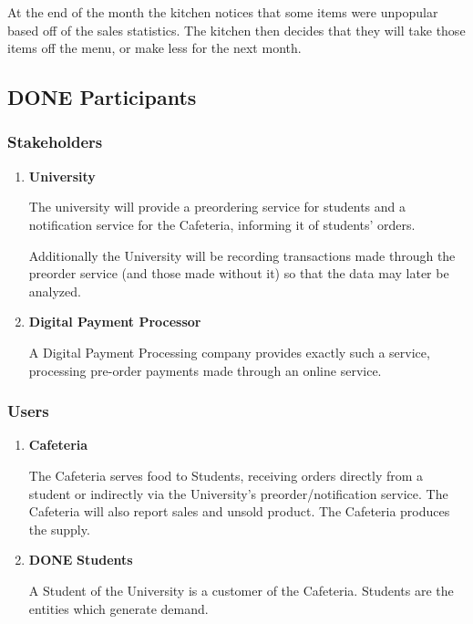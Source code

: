 \documentclass[11pt]{article}
\begin{document}
At the end of the month the kitchen notices that some items were
unpopular based off of the sales statistics. The kitchen then
decides that they will take those items off the menu, or make less
for the next month.
\subsection{{\bfseries\sffamily DONE} Participants}
\label{sec:org72a9f7d}
\subsubsection{Stakeholders}
\label{sec:org525f340}
\begin{enumerate}
\item \textbf{University}
\label{sec:org69ce2aa}

The university will provide a preordering service for students
and a notification service for the Cafeteria, informing it of
students' orders.

Additionally the University will be recording transactions made
through the preorder service (and those made without it) so that
the data may later be analyzed.

\item \textbf{Digital Payment Processor}
\label{sec:orgeb63209}

A Digital Payment Processing company provides exactly such a
service, processing pre-order payments made through an online
service.
\end{enumerate}

\subsubsection{Users}
\label{sec:org4b657c3}
\begin{enumerate}
\item \textbf{Cafeteria}
\label{sec:orgdcb43b9}

The Cafeteria serves food to Students, receiving orders directly
from a student or indirectly via the University's
preorder/notification service. The Cafeteria will also report
sales and unsold product. The Cafeteria produces the supply.

\item {\bfseries\sffamily DONE} \textbf{Students}
\label{sec:orge5c79e8}

A Student of the University is a customer of the
Cafeteria. Students are the entities which generate demand.
\end{enumerate}
\end{document}
